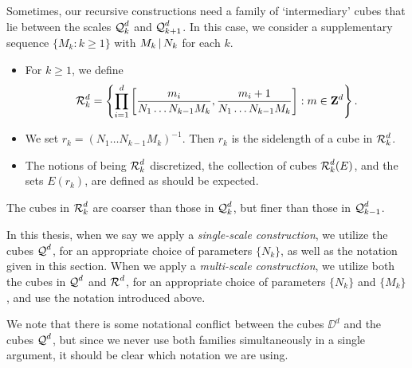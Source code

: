 %
%
Sometimes, our recursive constructions need a family of `intermediary' cubes that lie between the scales $\operatorname{\mathcal{Q}}_k^d$ and $\operatorname{\mathcal{Q}}_{k+1}^d$. In this case, we consider a supplementary sequence $\{ M_k : k \geq 1 \}$ with $M_k \operatorname{\mid} N_k$ for each $k$.
%
\begin{itemize}
	\item For $k \geq 1$, we define
	\[ \operatorname{\mathcal{R}}_k^d = \left\{ \prod_{i = 1}^d \left[ \frac{m_i}{N_1 \dots N_{k-1} M_k} , \frac{m_i + 1}{N_1 \dots N_{k-1} M_k} \right] : m \in \mathbf{Z}^d \right\}. \]

	\item We set $r_k = (N_1 \dots N_{k-1} M_k)^{-1}$. Then $r_k$ is the sidelength of a cube in $\operatorname{\mathcal{R}}_k^d$.

	\item The notions of being $\operatorname{\mathcal{R}}_k^d$ discretized, the collection of cubes $\operatorname{\mathcal{R}}_k^d(E)$, and the sets $E(r_k)$, are defined as should be expected.
\end{itemize}
%
The cubes in $\operatorname{\mathcal{R}}_k^d$ are coarser than those in $\operatorname{\mathcal{Q}}_k^d$, but finer than those in $\operatorname{\mathcal{Q}}_{k-1}^d$.

In this thesis, when we say we apply a \emph{single-scale construction}, we utilize the cubes $\operatorname{\mathcal{Q}}^d$, for an appropriate choice of parameters $\{ N_k \}$, as well as the notation given in this section. When we apply a \emph{multi-scale construction}, we utilize both the cubes in $\operatorname{\mathcal{Q}}^d$ and $\operatorname{\mathcal{R}}^d$, for an appropriate choice of parameters $\{ N_k \}$ and $\{ M_k \}$, and use the notation introduced above.

\begin{remark}
	We note that there is some notational conflict between the cubes $\DD^d$ and the cubes $\operatorname{\mathcal{Q}}^d$, but since we never use both families simultaneously in a single argument, it should be clear which notation we are using.
\end{remark}

%
%
%
%

